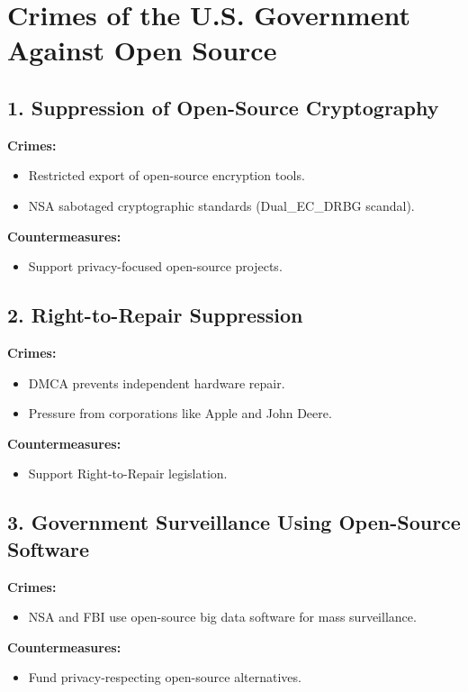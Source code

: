 \documentclass[12pt]{article}
\begin{document}
\newpage
\section{Crimes of the U.S. Government Against Open Source}

\subsection{1. Suppression of Open-Source Cryptography}
\textbf{Crimes:}
\begin{itemize}
    \item Restricted export of open-source encryption tools.
    \item NSA sabotaged cryptographic standards (Dual\_EC\_DRBG scandal).
\end{itemize}

\textbf{Countermeasures:}
\begin{itemize}
    \item Support privacy-focused open-source projects.
\end{itemize}

\subsection{2. Right-to-Repair Suppression}
\textbf{Crimes:}
\begin{itemize}
    \item DMCA prevents independent hardware repair.
    \item Pressure from corporations like Apple and John Deere.
\end{itemize}

\textbf{Countermeasures:}
\begin{itemize}
    \item Support Right-to-Repair legislation.
\end{itemize}

\subsection{3. Government Surveillance Using Open-Source Software}
\textbf{Crimes:}
\begin{itemize}
    \item NSA and FBI use open-source big data software for mass surveillance.
\end{itemize}

\textbf{Countermeasures:}
\begin{itemize}
    \item Fund privacy-respecting open-source alternatives.
\end{itemize}
\end{document}
